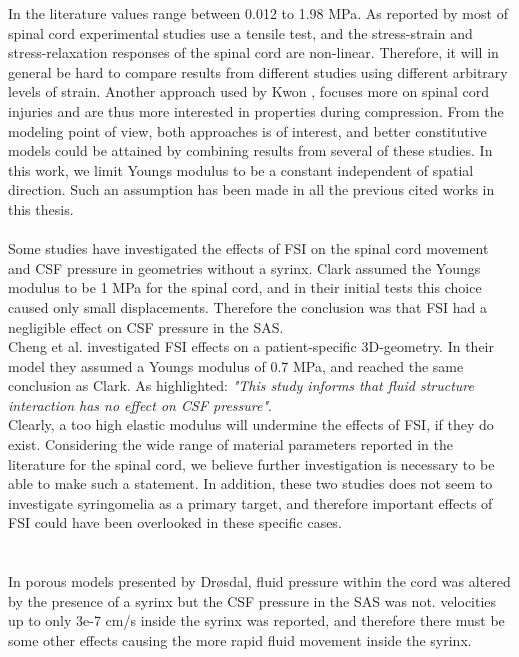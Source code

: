 In the literature values range between 0.012 to 1.98 MPa. As reported by \cite{Clar10} most of spinal cord experimental studies use a tensile test, and the stress-strain and stress-relaxation responses of the spinal cord are non-linear. Therefore, it will in general be hard to compare results from different studies using different arbitrary levels of strain. Another approach used by Kwon \cite{Kwon02}, focuses more on spinal cord injuries and are thus more interested in properties during compression. From the modeling point of view, both approaches is of interest, and better constitutive models could be attained by combining results from several of these studies. In this work, we limit Youngs modulus to be a constant independent of spatial direction. Such an assumption has been made in all the previous cited works in this thesis. 
\\
\\
Some studies have investigated the effects of FSI on the spinal cord movement and CSF pressure in geometries without a syrinx. Clark \cite{Clar13} assumed the Youngs modulus to be 1 MPa for the spinal cord, and in their initial tests this choice caused only small displacements. Therefore the conclusion was that FSI had a negligible effect on CSF pressure in the SAS. \\
Cheng et al. \cite{Chen14} investigated FSI effects on a patient-specific 3D-geometry. In their model they assumed a Youngs modulus of 0.7 MPa, and reached the same conclusion as Clark. As highlighted: \textit{"This study informs that fluid structure interaction has no effect on CSF pressure"}. 
\\ Clearly, a too high elastic modulus will undermine the effects of FSI, if they do exist. Considering the wide range of material parameters reported in the literature for the spinal cord, we believe further investigation is necessary to be able to make such a statement. In addition, these two studies does not seem to investigate syringomelia as a primary target, and therefore important effects of FSI could have been overlooked in these specific cases. \\
\\
\\
In porous models presented by Dr{\o}sdal, \cite{Dros11} fluid pressure within the cord was altered by the presence of a syrinx but the CSF pressure in the SAS was not. velocities up to only 3e-7 cm/s inside the syrinx was reported, and therefore there must be some other effects causing the more rapid fluid movement inside the syrinx.  
